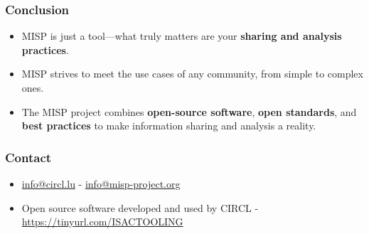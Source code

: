 \begin{frame}
    \frametitle{Conclusion}
    \begin{itemize}
        \item MISP is just a tool—what truly matters are your \textbf{sharing and analysis practices}.
        \item MISP strives to meet the use cases of any community, from simple to complex ones.
        \item The MISP project combines \textbf{open-source software}, \textbf{open standards}, and \textbf{best practices} to make information sharing and analysis a reality.
    \end{itemize}
\end{frame}


\begin{frame}
     \frametitle{Contact}
     \begin{itemize}
	     \item \url{info@circl.lu} - \url{info@misp-project.org}
	     \item Open source software developed and used by CIRCL - \url{https://tinyurl.com/ISACTOOLING}
     \end{itemize}
\end{frame}


